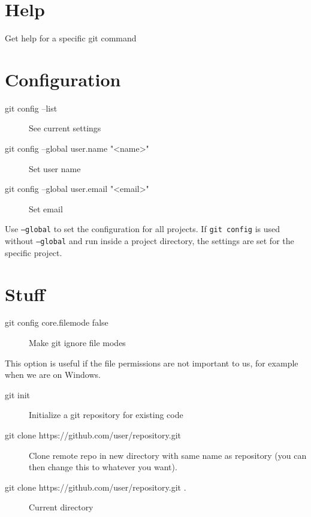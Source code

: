 \documentclass{article}
\begin{document}
\section{Help}
\begin{description}[labelwidth=20em, leftmargin=22em]
    \item [git help <command>] Get help for a specific git command
\end{description}

\section{Configuration}
\begin{description}
    \item [git config --list] See current settings
    \item [git config --global user.name "<name>"] Set user name
    \item [git config --global user.email "<email>"] Set email
\end{description}
Use \texttt{--global} to set the configuration for all projects.
If \texttt{git config}
is used without \texttt{--global} and run inside a project directory, the
settings are set for the specific project.

\section{Stuff}
\begin{description}
    \item [git config core.filemode false] Make git ignore file modes
\end{description}
This option is useful if the file permissions are not important to us, for
example when we are on Windows.

\begin{description}
    \item [git init] Initialize a git repository for existing code
    \item [git clone https://github.com/user/repository.git]
        Clone remote repo in new directory with same name as repository
        (you can then change this to whatever you want).
    \item [git clone https://github.com/user/repository.git .]
        Current directory
\end{description}
\end{document}
